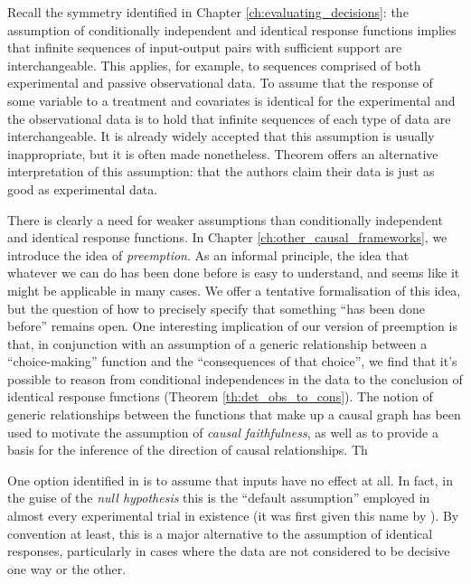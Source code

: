 Recall the symmetry identified in Chapter \ref{ch:evaluating_decisions}: the assumption of conditionally independent and identical response functions implies that infinite sequences of input-output pairs with sufficient support are interchangeable. This applies, for example, to sequences comprised of both experimental and passive observational data. To assume that the response of some variable to a treatment and covariates is identical for the experimental and the observational data is to hold that infinite sequences of each type of data are interchangeable. It is already widely accepted that this assumption is usually inappropriate, but it is often made nonetheless. Theorem  offers an alternative interpretation of this assumption: that the authors claim their data is just as good as experimental data.

There is clearly a need for weaker assumptions than conditionally independent and identical response functions. In Chapter \ref{ch:other_causal_frameworks}, we introduce the idea of \emph{preemption}. As an informal principle, the idea that whatever we can do has been done before is easy to understand, and seems like it might be applicable in many cases. We offer a tentative formalisation of this idea, but the question of how to precisely specify that something ``has been done before'' remains open. One interesting implication of our version of preemption is that, in conjunction with an assumption of a generic relationship between a ``choice-making'' function and the ``consequences of that choice'', we find that it's possible to reason from conditional independences in the data to the conclusion of identical response functions (Theorem \ref{th:det_obs_to_cons}). The notion of generic relationships between the functions that make up a causal graph has been used to motivate the assumption of \emph{causal faithfulness}, as well as to provide a basis for the inference of the direction of causal relationships. Th

One option identified in \citet{duvenaud_causal_2008} is to assume that inputs have no effect at all. In fact, in the guise of the \emph{null hypothesis} this is the ``default assumption'' employed in almost every experimental trial in existence (it was first given this name by \citet{fisher_design_1971}). By convention at least, this is a major alternative to the assumption of identical responses, particularly in cases where the data are not considered to be decisive one way or the other. 


